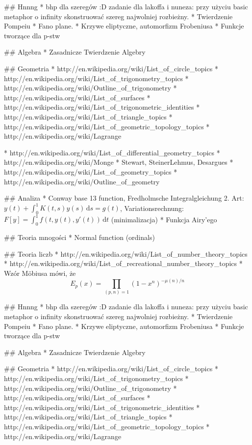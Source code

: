 ## Hnnng
* bhp dla szeregów :D zadanie dla lakoffa i nuneza: przy użyciu basic metaphor o infinity skonstruować szereg najwolniej rozbieżny.
* Twierdzenie Pompeiu
* Fano plane.
* Krzywe eliptyczne, automorfizm Frobeniusa
* Funkcje tworzące dla p-stw

## Algebra
* Zasadnicze Twierdzenie Algebry

## Geometria
* http://en.wikipedia.org/wiki/List_of_circle_topics 
* http://en.wikipedia.org/wiki/List_of_trigonometry_topics
* http://en.wikipedia.org/wiki/Outline_of_trigonometry
* http://en.wikipedia.org/wiki/List_of_surfaces
* http://en.wikipedia.org/wiki/List_of_trigonometric_identities
* http://en.wikipedia.org/wiki/List_of_triangle_topics
* http://en.wikipedia.org/wiki/List_of_geometric_topology_topics
* http://en.wikipedia.org/wiki/Lagrange%

* http://en.wikipedia.org/wiki/List_of_differential_geometry_topics
* http://en.wikipedia.org/wiki/Monge%
* Stewart, SteinerLehmus, Desargues
* http://en.wikipedia.org/wiki/List_of_geometry_topics
* http://en.wikipedia.org/wiki/Outline_of_geometry

## Analiza 
* Conway base 13 function, Fredholmsche Integralgleichung 2. Art: $y(t) + \int_0^1 K(t,s) y(s) \, \textrm{d}s = g(t)$, Variationsrechnung: $F[y] = \int_0^1 f(t, y(t), y'(t))\, \textrm{d} t$ (minimalizacja)
* Funkcja Airy'ego

## Teoria mnogości
* Normal function (ordinals)

## Teoria liczb
* http://en.wikipedia.org/wiki/List_of_number_theory_topics
* http://en.wikipedia.org/wiki/List_of_recreational_number_theory_topics
* Wzór Möbiusa mówi, że $$E_p(x) = \prod_{(p,n)=1}(1-x^n)^{-\mu(n)/n}$$

## Hnnng
* bhp dla szeregów :D zadanie dla lakoffa i nuneza: przy użyciu basic metaphor o infinity skonstruować szereg najwolniej rozbieżny.
* Twierdzenie Pompeiu
* Fano plane.
* Krzywe eliptyczne, automorfizm Frobeniusa
* Funkcje tworzące dla p-stw

## Algebra
* Zasadnicze Twierdzenie Algebry

## Geometria
* http://en.wikipedia.org/wiki/List_of_circle_topics 
* http://en.wikipedia.org/wiki/List_of_trigonometry_topics
* http://en.wikipedia.org/wiki/Outline_of_trigonometry
* http://en.wikipedia.org/wiki/List_of_surfaces
* http://en.wikipedia.org/wiki/List_of_trigonometric_identities
* http://en.wikipedia.org/wiki/List_of_triangle_topics
* http://en.wikipedia.org/wiki/List_of_geometric_topology_topics
* http://en.wikipedia.org/wiki/Lagrange%


